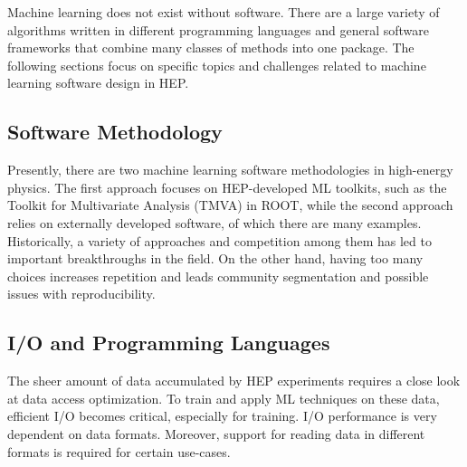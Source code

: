 
Machine learning does not exist without software. There are a large variety of algorithms written in different programming languages and general software frameworks that combine many classes of methods into one package. The following sections focus on specific topics and challenges related to machine learning software design in HEP.



\subsection{Software Methodology}
Presently, there are two machine learning software methodologies in high-energy physics. The first approach focuses on HEP-developed ML toolkits, such as the Toolkit for Multivariate Analysis (TMVA) in ROOT, while the second approach relies on externally developed software, of which there are many examples. Historically, a variety of approaches and competition among them has led to important breakthroughs in the field. On the other hand, having too many choices increases repetition and leads community segmentation and possible issues with reproducibility.


\subsection{I/O and Programming Languages}\label{sec:software_IO}
The sheer amount of data accumulated by HEP experiments requires a close look at data access optimization. To train and apply ML techniques on these data, efficient I/O becomes critical, especially for training. I/O performance is very dependent on data formats. Moreover, support for reading data in different formats is required for certain use-cases.\\

